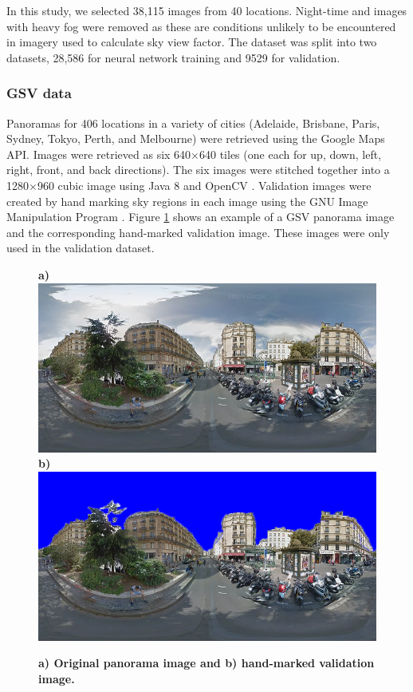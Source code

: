 \documentclass[final,3p,times,authoryear]{elsarticle}
\begin{document}
In this study, we selected 38,115 images from 40 locations. Night-time and images with heavy fog were removed as these are conditions unlikely to be encountered in imagery used to calculate sky view factor. The dataset was split into two datasets, 28,586 for neural network training and 9529 for validation.

\subsubsection{GSV data}\label{sec:gsvdata}
Panoramas for 406 locations in a variety of cities (Adelaide, Brisbane, Paris, Sydney, Tokyo, Perth, and Melbourne) were retrieved using the Google Maps API. Images were retrieved as six 640$\times$640 tiles (one each for up, down, left, right, front, and back directions). The six images were stitched together into a 1280$\times$960 cubic image using Java 8 \citep{Oracle2018} and OpenCV \citep {Bradski2000}. Validation images were created by hand marking sky regions in each image using the GNU Image Manipulation Program \citep{GIMP2019}. Figure \ref{fig:origmarked} shows an example of a GSV panorama image and the corresponding hand-marked validation image. These images were only used in the validation dataset.

\begin{figure}
\centering    
\textbf{a)}\includegraphics[scale=0.26]{Images/2/panorama-JtVHmEl7WCiz1xJ0bcJpBg-1.png} 
\textbf{b)}\includegraphics[scale=0.26]{Images/2/panorama-JtVHmEl7WCiz1xJ0bcJpBg-1-marked.png} 

\caption{\bf a) Original panorama image and b) hand-marked validation image.}    
 \label{fig:origmarked}  
\end{figure} 
\end{document}
